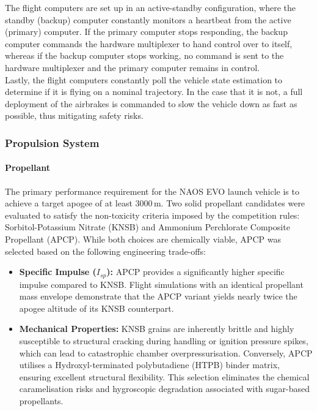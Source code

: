 \documentclass[11pt,a4paper]{article}
\begin{document}
The flight computers are set up in an active-standby configuration, where the standby (backup) computer constantly monitors a heartbeat from the active (primary) computer. If the primary computer stops responding, the backup computer commands the hardware multiplexer to hand control over to itself, whereas if the backup computer stops working, no command is sent to the hardware multiplexer and the primary computer remains in control.\\

Lastly, the flight computers constantly poll the vehicle state estimation to determine if it is flying on a nominal trajectory. In the case that it is not, a full deployment of the airbrakes is commanded to slow the vehicle down as fast as possible, thus mitigating safety risks.

\subsubsection{Propulsion System}

\paragraph{Propellant}
The primary performance requirement for the NAOS EVO launch vehicle is to achieve a target apogee of at least $3000\,\text{m}$. Two solid propellant candidates were evaluated to satisfy the non-toxicity criteria imposed by the competition rules: Sorbitol-Potassium Nitrate (KNSB) and Ammonium Perchlorate Composite Propellant (APCP). While both choices are chemically viable, APCP was selected based on the following engineering trade-offs:

\begin{itemize}
    \item \textbf{Specific Impulse ($I_{sp}$):} APCP provides a significantly higher specific impulse compared to KNSB. Flight simulations with an identical propellant mass envelope demonstrate that the APCP variant yields nearly twice the apogee altitude of its KNSB counterpart.
    \item \textbf{Mechanical Properties:} KNSB grains are inherently brittle and highly susceptible to structural cracking during handling or ignition pressure spikes, which can lead to catastrophic chamber overpressurisation. Conversely, APCP utilises a Hydroxyl-terminated polybutadiene (HTPB) binder matrix, ensuring excellent structural flexibility. This selection eliminates the chemical caramelisation risks and hygroscopic degradation associated with sugar-based propellants.
\end{itemize}
\end{document}

